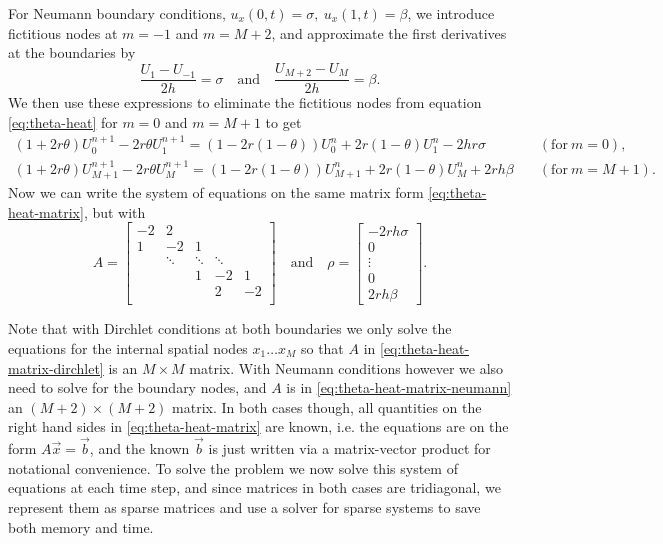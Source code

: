 For Neumann boundary conditions, $u_x(0, t) = \sigma, \: u_x(1, t) = \beta$, 
we introduce fictitious nodes at $m=-1$ and $m=M+2$, 
and approximate the first derivatives at the boundaries by
\begin{equation*}
    \frac{U_1 - U_{-1}}{2h} = \sigma
    \quad \text{and} \quad
    \frac{U_{M+2} - U_{M}}{2h} = \beta. 
\end{equation*}
We then use these expressions to eliminate the fictitious nodes from equation \eqref{eq:theta-heat} for $m=0$ and $m=M+1$ to get
\begin{align*}
    \left(1+2r\theta\right)U_0^{n+1} - 2r\theta U_1^{n+1} = \left(1-2r(1-\theta)\right)U_0^n + 2r\left(1-\theta\right)U_1^n - 2hr\sigma
    \quad & (\text{for} \: m=0), \\
    \left(1+2r\theta\right)U_{M+1}^{n+1} - 2r\theta U_M^{n+1} = \left(1-2r(1-\theta)\right)U_{M+1}^n + 2r\left(1-\theta\right)U_M^n + 2rh\beta
    \quad & (\text{for} \: m=M+1). 
\end{align*}
Now we can write the system of equations on the same matrix form \eqref{eq:theta-heat-matrix}, 
but with 
\begin{equation}
    A = 
    \begin{bmatrix}
    -2 & 2 \\
    1 & -2 & 1 & \\
      & \ddots & \ddots & \ddots & \\
      &   & 1 & -2 & 1 \\
      &   &  & 2 & -2 \\
    \end{bmatrix}
    \quad \text{and} \quad
    \rho = 
    \begin{bmatrix}
        -2rh\sigma \\ 0 \\ \vdots \\ 0 \\ 2rh\beta
    \end{bmatrix}
    .
    \label{eq:theta-heat-matrix-neumann}
\end{equation}

Note that with Dirchlet conditions at both boundaries we only solve the equations for the internal spatial nodes $x_1 \dots x_M$ so that $A$ in \eqref{eq:theta-heat-matrix-dirchlet} is an $M \times M$ matrix. 
With Neumann conditions however we also need to solve for the boundary nodes, 
and $A$ is in \eqref{eq:theta-heat-matrix-neumann} an $(M+2) \times (M+2)$ matrix. 
In both cases though, all quantities on the right hand sides in \eqref{eq:theta-heat-matrix} are known, 
i.e. the equations are on the form $A\vec{x}=\vec{b}$, 
and the known $\vec{b}$ is just written via a matrix-vector product for notational convenience. 
To solve the problem we now solve this system of equations at each time step, 
and since matrices in both cases are tridiagonal, 
we represent them as sparse matrices and use a solver for sparse systems to save both memory and time. 

